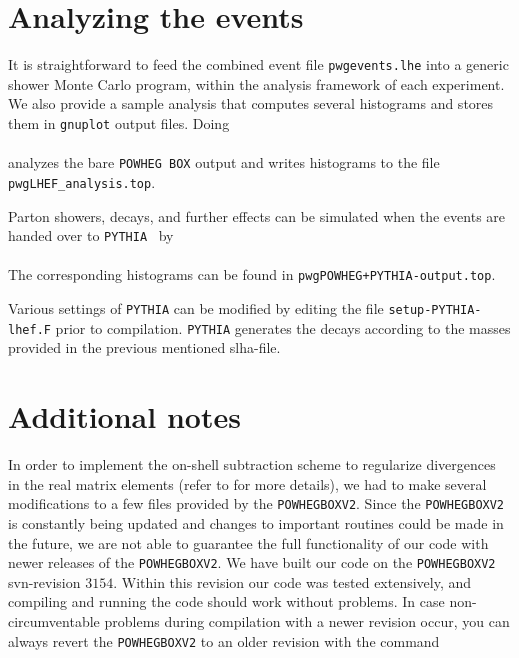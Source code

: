 \documentclass[a4paper,11pt]{article}
\newcommand\POWHEGBOXvTWO{{\tt POWHEG\;BOX\;V2}}
\newcommand\PYTHIA{{\tt PYTHIA}}
\begin{document}
\section*{Analyzing the events}
It is straightforward to feed the combined event file {\tt pwgevents.lhe} into a generic shower Monte Carlo program, within the analysis framework of each experiment. We also provide a sample analysis that computes several histograms and stores them in {\tt gnuplot} output files. Doing
\\[2ex]
\hspace*{2cm}{\tt \$ ../lhef\_analysis}
\\[2ex]
analyzes the bare {\tt POWHEG BOX} output and writes histograms to the file {\tt pwgLHEF\_analysis.top}.

Parton showers, decays, and further effects can be simulated when the events are handed over to \PYTHIA{}~\cite{Sjostrand:2006za} by
\\[2ex]
\hspace*{2cm}{\tt \$ ../main-PYTHIA-lhef}
\\[2ex]
The corresponding histograms can be found in {\tt pwgPOWHEG+PYTHIA-output.top}.

Various settings of \PYTHIA{} can be modified by editing the file {\tt setup-PYTHIA-lhef.F} prior to compilation. \PYTHIA{} generates the decays according to the masses provided in the previous mentioned slha-file.

\section*{Additional notes}
In order to implement the on-shell subtraction scheme to regularize divergences in the real matrix elements (refer to \cite{Baglio:2016} for more details), we had to make several modifications to a few files provided by the \POWHEGBOXvTWO. Since the \POWHEGBOXvTWO{} is constantly being updated and changes to important routines could be made in the future, we are not able to guarantee the full functionality of our code with newer releases of the \POWHEGBOXvTWO. We have built our code on the \POWHEGBOXvTWO{} svn-revision $3154$. Within this revision our code was tested extensively, and compiling and running the code should work without problems. In case  non-circumventable problems during compilation with a newer revision occur, you can always revert the \POWHEGBOXvTWO{} to an older revision with the command
\\[2ex]
\hspace*{2cm}{\tt \$ svn update -r $3154$}
\\[2ex]
\end{document}

